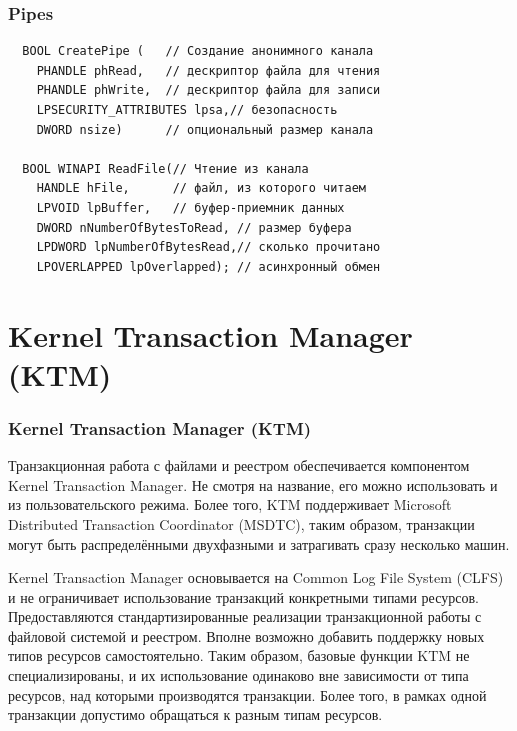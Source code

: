 \documentclass{beamer}
\begin{document}

\begin{frame}[fragile]
\frametitle{Pipes}

\begin{verbatim}
  BOOL CreatePipe (   // Создание анонимного канала
    PHANDLE phRead,   // дескриптор файла для чтения
    PHANDLE phWrite,  // дескриптор файла для записи
    LPSECURITY_ATTRIBUTES lpsa,// безопасность
    DWORD nsize)      // опциональный размер канала

  BOOL WINAPI ReadFile(// Чтение из канала
    HANDLE hFile,      // файл, из которого читаем
    LPVOID lpBuffer,   // буфер-приемник данных
    DWORD nNumberOfBytesToRead, // размер буфера
    LPDWORD lpNumberOfBytesRead,// сколько прочитано
    LPOVERLAPPED lpOverlapped); // асинхронный обмен
\end{verbatim}

\end{frame}

\section{Kernel Transaction Manager (KTM)}

\begin{frame}
\frametitle{Kernel Transaction Manager (KTM)}
Транзакционная работа с файлами и реестром обеспечивается компонентом Kernel Transaction Manager. Не смотря на название, его можно использовать и из пользовательского режима. Более того, KTM поддерживает Microsoft Distributed Transaction Coordinator (MSDTC), таким образом, транзакции могут быть распределёнными двухфазными и затрагивать сразу несколько машин.
\medskip

Kernel Transaction Manager основывается на Common Log File System (CLFS) и не ограничивает использование транзакций конкретными типами ресурсов. Предоставляются стандартизированные реализации транзакционной работы с файловой системой и реестром. Вполне возможно добавить поддержку новых типов ресурсов самостоятельно. Таким образом, базовые функции KTM не специализированы, и их использование одинаково вне зависимости от типа ресурсов, над которыми производятся транзакции. Более того, в рамках одной транзакции допустимо обращаться к разным типам ресурсов.
\end{frame}

\end{document}
